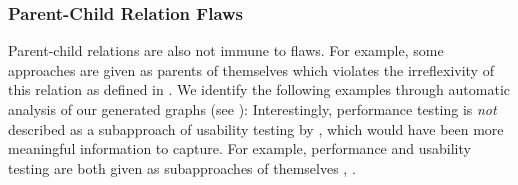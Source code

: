 \subsubsection{Parent-Child Relation Flaws}\label{pars}
\label{selfPars}
Parent-child relations are also not immune to flaws. For example, some
approaches are given as parents of themselves which violates the
irreflexivity of this relation as defined in .
\ifnotpaper We identify
    the following \selfParCount{} examples through automatic analysis of our
    generated graphs (see ):
     Interestingly, performance testing is \emph{not}
    described as a subapproach of usability testing by \citep{Gerrard2000a,
        Gerrard2000b}, which would have been more meaningful information to
    capture. \else For example, performance and usability testing are both
    given as subapproaches of themselves \cite[Tab.~2]{Gerrard2000a},
    \cite[Tab.~1]{Gerrard2000b}.\fi


